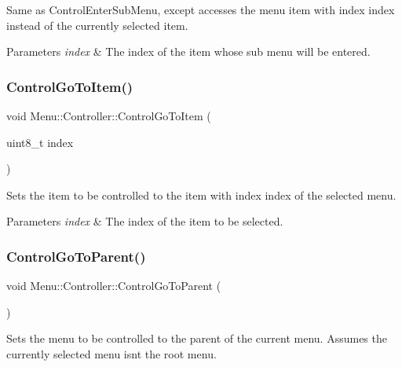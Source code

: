 Same as Control\+Enter\+Sub\+Menu, except accesses the menu item with index index instead of the currently selected item. 
\begin{DoxyParams}{Parameters}
{\em index} & The index of the item whose sub menu will be entered. \\
\hline
\end{DoxyParams}
\hypertarget{class_menu_1_1_controller_a0dae623388e9bb9e651385d0ef9a2394}{}\label{class_menu_1_1_controller_a0dae623388e9bb9e651385d0ef9a2394} 
\subsubsection{\texorpdfstring{Control\+Go\+To\+Item()}{ControlGoToItem()}}
{\footnotesize\ttfamily void Menu\+::\+Controller\+::\+Control\+Go\+To\+Item (\begin{DoxyParamCaption}\item[{uint8\+\_\+t}]{index }\end{DoxyParamCaption})}

Sets the item to be controlled to the item with index index of the selected menu. 
\begin{DoxyParams}{Parameters}
{\em index} & The index of the item to be selected. \\
\hline
\end{DoxyParams}
\hypertarget{class_menu_1_1_controller_ad4bcb0925c933dce2cceacdbd1b26294}{}\label{class_menu_1_1_controller_ad4bcb0925c933dce2cceacdbd1b26294} 
\subsubsection{\texorpdfstring{Control\+Go\+To\+Parent()}{ControlGoToParent()}}
{\footnotesize\ttfamily void Menu\+::\+Controller\+::\+Control\+Go\+To\+Parent (\begin{DoxyParamCaption}{ }\end{DoxyParamCaption})}

Sets the menu to be controlled to the parent of the current menu. Assumes the currently selected menu isn\textquotesingle{}t the root menu. \hypertarget{class_menu_1_1_controller_a4d270009fff9dfc6baa4433f219626c4}{}\label{class_menu_1_1_controller_a4d270009fff9dfc6baa4433f219626c4} 
